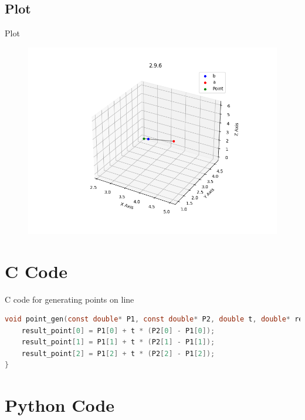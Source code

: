 \documentclass{beamer}
\theoremstyle{remark}
\numberwithin{equation}{section}
\begin{document}
\subsection{Plot}
\begin{frame}{Plot}
 \begin{figure}[H]
    \centering
    \includegraphics[width=0.8\columnwidth]{../figs/plot.png}
    \caption*{}
    \label{fig:plot}
\end{figure}
\end{frame}

\section{C Code}
\begin{frame}[fragile]{C code for generating points on line}
\begin{lstlisting}[language=C]
 void point_gen(const double* P1, const double* P2, double t, double* result_point) {
    result_point[0] = P1[0] + t * (P2[0] - P1[0]);
    result_point[1] = P1[1] + t * (P2[1] - P1[1]);
    result_point[2] = P1[2] + t * (P2[2] - P1[2]);
}
\end{lstlisting}
\end{frame}

\section{Python Code}
\end{document}

